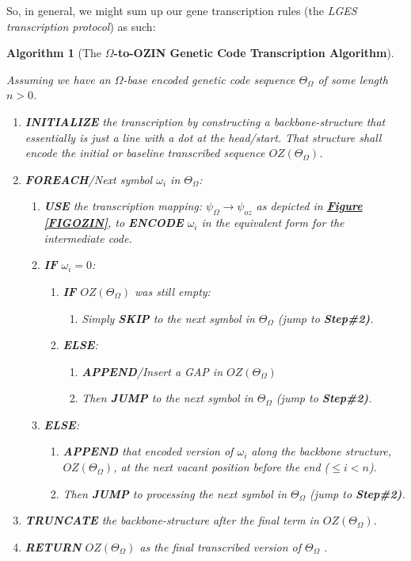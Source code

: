 \documentclass[a4paper, 18pt]{book} %
\newtheorem{alg}{Algorithm}
\begin{document}
So, in general, we might sum up our gene transcription rules (the \textit{LGES transcription protocol}) as such:

\vspace{2em}
\begin{alg}[The \textbf{$\Omega$-to-OZIN Genetic Code Transcription Algorithm}]
\label{ALGCOZIN}

Assuming we have an $\Omega$-base encoded genetic code sequence $\Theta_\Omega$ of some length $n > 0$.

\begin{enumerate}
\item \textbf{INITIALIZE} the transcription by constructing a backbone-structure that essentially is just a line with a dot at the head/start. That structure shall encode the initial or baseline transcribed sequence $OZ(\Theta_\Omega)$.
\item{\textbf{FOREACH}/Next symbol $\omega_i$ in $\Theta_\Omega$: 
\begin{enumerate}
    \item \textbf{USE} the transcription mapping: $\psi_\Omega \rightarrow \psi_{oz}$ as depicted in \textbf{\hyperref[FIGOZIN]{Figure \ref{FIGOZIN}}}, to \textbf{ENCODE} $\omega_i$  in the equivalent form for the intermediate code.
	\item{\textbf{IF} $\omega_i = 0$:
	\begin{enumerate}
	\item{ \textbf{IF} $OZ(\Theta_\Omega)$ was still empty:
	\begin{enumerate}
		\item Simply \textbf{SKIP} to the next symbol in $\Theta_\Omega$ (jump to \textbf{Step\#2)}.
	\end{enumerate}
		}
		\item{ \textbf{ELSE}: 
		\begin{enumerate}
		\item  \textbf{APPEND}/Insert a GAP in $OZ(\Theta_\Omega)$
		\item Then \textbf{JUMP} to the next symbol in $\Theta_\Omega$ (jump to \textbf{Step\#2)}.
		\end{enumerate}
		}
	\end{enumerate}
	}
	\item { \textbf{ELSE}:
	\begin{enumerate}
	\item \textbf{APPEND} that encoded version of $\omega_i$ along the backbone structure, $OZ(\Theta_\Omega)$, at the next vacant position before the end ($\leq i < n$).
	\item Then \textbf{JUMP} to processing the next symbol in $\Theta_\Omega$ (jump to \textbf{Step\#2)}.
	\end{enumerate}
	}
\end{enumerate}
}
\item \textbf{TRUNCATE} the backbone-structure after the final term in $OZ(\Theta_\Omega)$.
\item \textbf{RETURN} $OZ(\Theta_\Omega)$ as the final transcribed version of $\Theta_\Omega$ .
\end{enumerate}

\end{alg}
\end{document}
